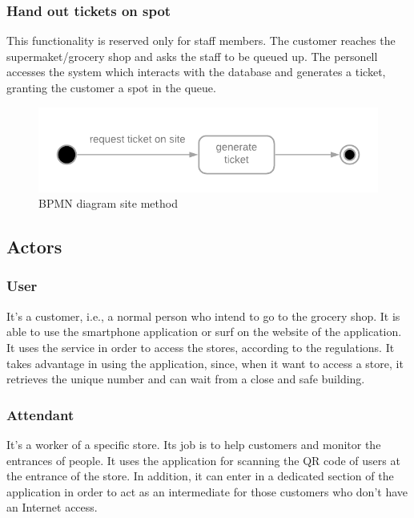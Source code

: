 \documentclass[table, 12pt]{article}
\begin{document}
\subsubsection{Hand out tickets on spot}

This functionality is reserved only for staff members. The customer reaches the supermaket/grocery shop and asks the staff to be queued up. The personell accesses the system which interacts with the database and generates a ticket, granting the customer a spot in the queue.
\begin{figure}[!htb]
    \begin{center}
        \includegraphics[scale=0.5]{assets/function-hand-up.png}
        \caption{BPMN diagram site method}
    \end{center}
\end{figure}

\subsection{Actors}
\subsubsection{User}
It's a customer, i.e., a normal person who intend to go to the grocery shop. It is able to use the smartphone application or surf on the website of the application. It uses the service in order to access the stores, according to the regulations. It takes advantage in using the application, since, when it want to access a store, it retrieves the unique number and can wait from a close and safe building.

\subsubsection{Attendant}
It's a worker of a specific store. Its job is to help customers and monitor the entrances of people. It uses the application for scanning the QR code of users at the entrance of the store. In addition, it can enter in a dedicated section of the application in order to act as an intermediate for those customers who don't have an Internet access.
\end{document}
